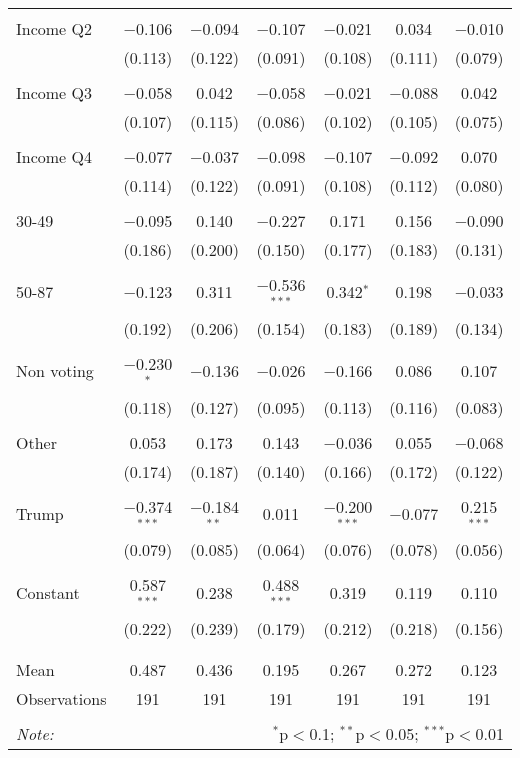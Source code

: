 \begin{tabular}{@{\extracolsep{5pt}}lcccccc}
  & & & & & & \\ 
 Income Q2 & $-$0.106 & $-$0.094 & $-$0.107 & $-$0.021 & 0.034 & $-$0.010 \\ 
  & (0.113) & (0.122) & (0.091) & (0.108) & (0.111) & (0.079) \\ 
  & & & & & & \\ 
 Income Q3 & $-$0.058 & 0.042 & $-$0.058 & $-$0.021 & $-$0.088 & 0.042 \\ 
  & (0.107) & (0.115) & (0.086) & (0.102) & (0.105) & (0.075) \\ 
  & & & & & & \\ 
 Income Q4 & $-$0.077 & $-$0.037 & $-$0.098 & $-$0.107 & $-$0.092 & 0.070 \\ 
  & (0.114) & (0.122) & (0.091) & (0.108) & (0.112) & (0.080) \\ 
  & & & & & & \\ 
 30-49 & $-$0.095 & 0.140 & $-$0.227 & 0.171 & 0.156 & $-$0.090 \\ 
  & (0.186) & (0.200) & (0.150) & (0.177) & (0.183) & (0.131) \\ 
  & & & & & & \\ 
 50-87 & $-$0.123 & 0.311 & $-$0.536$^{***}$ & 0.342$^{*}$ & 0.198 & $-$0.033 \\ 
  & (0.192) & (0.206) & (0.154) & (0.183) & (0.189) & (0.134) \\ 
  & & & & & & \\ 
 Non voting & $-$0.230$^{*}$ & $-$0.136 & $-$0.026 & $-$0.166 & 0.086 & 0.107 \\ 
  & (0.118) & (0.127) & (0.095) & (0.113) & (0.116) & (0.083) \\ 
  & & & & & & \\ 
 Other & 0.053 & 0.173 & 0.143 & $-$0.036 & 0.055 & $-$0.068 \\ 
  & (0.174) & (0.187) & (0.140) & (0.166) & (0.172) & (0.122) \\ 
  & & & & & & \\ 
 Trump & $-$0.374$^{***}$ & $-$0.184$^{**}$ & 0.011 & $-$0.200$^{***}$ & $-$0.077 & 0.215$^{***}$ \\ 
  & (0.079) & (0.085) & (0.064) & (0.076) & (0.078) & (0.056) \\ 
  & & & & & & \\ 
 Constant & 0.587$^{***}$ & 0.238 & 0.488$^{***}$ & 0.319 & 0.119 & 0.110 \\ 
  & (0.222) & (0.239) & (0.179) & (0.212) & (0.218) & (0.156) \\ 
  & & & & & & \\ 
\hline \\[-1.8ex] 
Mean & 0.487 & 0.436 & 0.195 & 0.267 & 0.272 & 0.123 \\ 
Observations & 191 & 191 & 191 & 191 & 191 & 191 \\ 
\hline 
\hline \\[-1.8ex] 
\textit{Note:}  & \multicolumn{6}{r}{$^{*}$p$<$0.1; $^{**}$p$<$0.05; $^{***}$p$<$0.01} \\ 
\end{tabular} 
